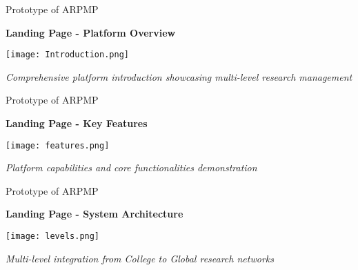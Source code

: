 \documentclass[aspectratio=169]{beamer}
\begin{document}
\begin{frame}{Prototype of ARPMP}
\begin{center}
\textbf{\Large Landing Page - Platform Overview}
\end{center}

\vspace{0.5cm}

\begin{center}
\texttt{[image: Introduction.png]}
\end{center}

\vspace{0.3cm}

\begin{center}
\textit{Comprehensive platform introduction showcasing multi-level research management}
\end{center}

\end{frame}

\begin{frame}{Prototype of ARPMP}
\begin{center}
\textbf{\Large Landing Page - Key Features}
\end{center}

\vspace{0.2cm}

\begin{center}
\texttt{[image: features.png]}
\end{center}

\vspace{0.3cm}

\begin{center}
\textit{Platform capabilities and core functionalities demonstration}
\end{center}

\end{frame}

\begin{frame}{Prototype of ARPMP}
\begin{center}
\textbf{\Large Landing Page - System Architecture}
\end{center}

\vspace{0.2cm}

\begin{center}
\texttt{[image: levels.png]}
\end{center}

\vspace{0.3cm}

\begin{center}
\textit{Multi-level integration from College to Global research networks}
\end{center}

\end{frame}
\end{document}
